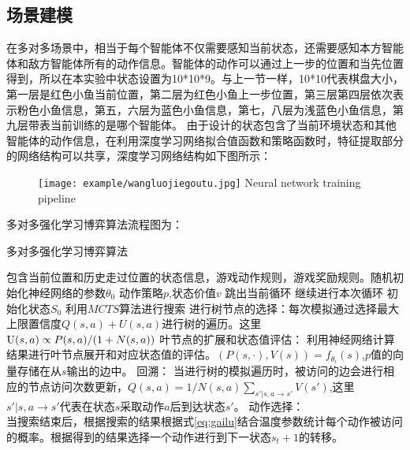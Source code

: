 \subsection{场景建模}
在多对多场景中，相当于每个智能体不仅需要感知当前状态，还需要感知本方智能体和敌方智能体所有的动作信息。智能体的动作可以通过上一步的位置和当先位置得到，所以在本实验中状态设置为10*10*9。与上一节一样，10*10代表棋盘大小，第一层是红色小鱼当前位置，第二层为红色小鱼上一步位置，第三层第四层依次表示粉色小鱼信息，第五，六层为蓝色小鱼信息，第七，八层为浅蓝色小鱼信息，第九层带表当前训练的是哪个智能体。
由于设计的状态包含了当前环境状态和其他智能体的动作信息，在利用深度学习网络拟合值函数和策略函数时，特征提取部分的网络结构可以共享，深度学习网络结构如下图所示：

\begin{figure}[!htpb]
	\centering
	\texttt{[image: example/wangluojiegoutu.jpg]}
	{Neural network training pipeline}
	\label{fig:wangluojiegoutu}
\end{figure}

多对多强化学习博弈算法流程图为：
\begin{algorithm}[!htbp]
	\caption{多对多强化学习博弈算法}%
	\begin{algorithmic}[1]%
		\Require
		包含当前位置和历史走过位置的状态信息，游戏动作规则，游戏奖励规则。随机初始化神经网络的参数$\theta_0$
		\Ensure 
		动作策略$p$,状态价值$v$
		\State 跳出当前循环
		\Else
		\State 继续进行本次循环
		\EndIf
		\State 初始化状态$S_0$
		\State 利用$MCTS$算法进行搜索
		\State 进行树节点的选择：每次模拟通过选择最大上限置信度$Q(s,a)+U(s,a)$进行树的遍历。这里${\rm{U}}(s,a) \propto P(s,a)/(1 + N(s,a))$
		\State 叶节点的扩展和状态值评估：
		利用神经网络计算结果进行叶节点展开和对应状态值的评估。$(P(s, \cdot ),V(s)) = {f_{{\theta _i}}}(s)$,$p$值的向量存储在从$s$输出的边中。
		\State 回溯：
		当进行树的模拟遍历时，被访问的边会进行相应的节点访问次数更新，$Q(s,a) = 1/N(s,a)\sum\nolimits_{s'|s,a \to s'} {V(s')} $,这里${s'|s,a \to s'}$代表在状态$s$采取动作$a$后到达状态$s'$。
		\EndWhile
		\State 动作选择：
		\\当搜索结束后，根据搜索的结果根据式\ref{eq:gailu}结合温度参数统计每个动作被访问的概率。根据得到的结果选择一个动作进行到下一状态$s_t+1$的转移。
		\EndFor
		\end{algorithmic}
		\end{algorithm}

